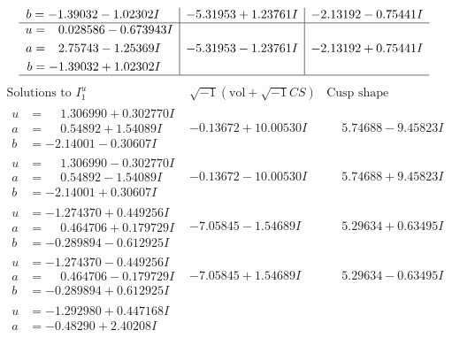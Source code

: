\documentclass[1p]{elsarticle_modified}
\theoremstyle{definition}
\newcommand{\I}{\sqrt{-1}}
\begin{document}
$$\begin{array}{c|c|c}
\begin{aligned}
b &= -1.39032 - 1.02302 I\end{aligned}
 & -5.31953 + 1.23761 I & -2.13192 - 0.75441 I \\ \hline\begin{aligned}
u &= \phantom{-}0.028586 - 0.673943 I \\
a &= \phantom{-}2.75743 - 1.25369 I \\
b &= -1.39032 + 1.02302 I\end{aligned}
 & -5.31953 - 1.23761 I & -2.13192 + 0.75441 I\\
 \hline 
 \end{array}$$\newpage$$\begin{array}{c|c|c}  
\text{Solutions to }I^u_{1}& \I (\text{vol} + \sqrt{-1}CS) & \text{Cusp shape}\\
 \hline 
\begin{aligned}
u &= \phantom{-}1.306990 + 0.302770 I \\
a &= \phantom{-}0.54892 + 1.54089 I \\
b &= -2.14001 - 0.30607 I\end{aligned}
 & -0.13672 + 10.00530 I & \phantom{-}5.74688 - 9.45823 I \\ \hline\begin{aligned}
u &= \phantom{-}1.306990 - 0.302770 I \\
a &= \phantom{-}0.54892 - 1.54089 I \\
b &= -2.14001 + 0.30607 I\end{aligned}
 & -0.13672 - 10.00530 I & \phantom{-}5.74688 + 9.45823 I \\ \hline\begin{aligned}
u &= -1.274370 + 0.449256 I \\
a &= \phantom{-}0.464706 + 0.179729 I \\
b &= -0.289894 - 0.612925 I\end{aligned}
 & -7.05845 - 1.54689 I & \phantom{-}5.29634 + 0.63495 I \\ \hline\begin{aligned}
u &= -1.274370 - 0.449256 I \\
a &= \phantom{-}0.464706 - 0.179729 I \\
b &= -0.289894 + 0.612925 I\end{aligned}
 & -7.05845 + 1.54689 I & \phantom{-}5.29634 - 0.63495 I \\ \hline\begin{aligned}
u &= -1.292980 + 0.447168 I \\
a &= -0.48290 + 2.40208 I \\

\end{aligned}
\end{array}$$
\end{document}
